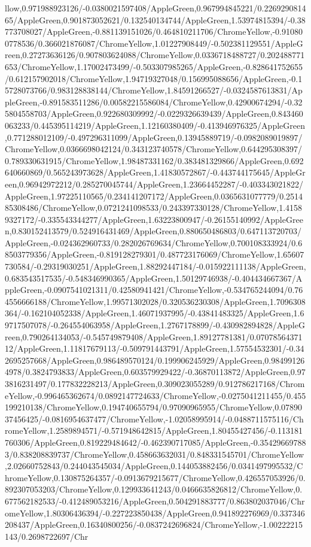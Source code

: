 {\begin{tikzternal}
llow,0.971988923126/-0.0380021597408/AppleGreen,0.967994845221/0.226929081465/AppleGreen,0.901873052621/0.132540134744/AppleGreen,1.53974815394/-0.38773708027/AppleGreen,-0.881139151026/0.464810211706/ChromeYellow,-0.910800778536/0.366021876087/ChromeYellow,1.01227908449/-0.502381129551/AppleGreen,0.27273636126/0.907803624088/ChromeYellow,0.0336718488727/0.202488771653/ChromeYellow,1.17002473499/-0.503307985265/AppleGreen,-0.828641752655/0.612157902018/ChromeYellow,1.94719327048/0.156995088656/AppleGreen,-0.15728073766/0.983128838144/ChromeYellow,1.84591266527/-0.0324587613831/AppleGreen,-0.891583511286/0.00582215586084/ChromeYellow,0.42900674294/-0.325804558703/AppleGreen,0.922680309992/-0.0229326639439/AppleGreen,0.843460063233/0.445395114219/AppleGreen,1.12160380409/-0.413946976325/AppleGreen,0.771288012109/-0.497296311099/AppleGreen,0.13945889719/-0.0982089019897/ChromeYellow,0.0366698042124/0.343123740578/ChromeYellow,0.644295308397/0.789330631915/ChromeYellow,1.98487331162/0.383481329866/AppleGreen,0.692640660869/0.565243973628/AppleGreen,1.41830572867/-0.443744175645/AppleGreen,0.96942972212/0.285270045744/AppleGreen,1.23664452287/-0.403343021822/AppleGreen,1.97225110565/0.234141207172/AppleGreen,0.0365631077779/0.251485308486/ChromeYellow,0.0721241098533/0.243397330128/ChromeYellow,1.41589327172/-0.335543344277/AppleGreen,1.63223800947/-0.26155140992/AppleGreen,0.830152413579/0.524916431469/AppleGreen,0.880650486803/0.647113720703/AppleGreen,-0.024362960733/0.282026769634/ChromeYellow,0.700108333924/0.68503779356/AppleGreen,-0.819128279301/0.487723176069/ChromeYellow,1.65607730584/-0.29319030251/AppleGreen,1.88292447184/-0.015922111138/AppleGreen,0.683543517535/-0.548346990365/AppleGreen,1.50129746938/-0.404434667367/AppleGreen,-0.0907541021311/0.42580941421/ChromeYellow,-0.534765244094/0.764556666188/ChromeYellow,1.99571302028/0.320536230308/AppleGreen,1.7096308364/-0.162104052338/AppleGreen,1.46071937995/-0.43841483325/AppleGreen,1.69717507078/-0.264554063958/AppleGreen,1.2767178899/-0.430982894828/AppleGreen,0.790264134053/-0.545749879408/AppleGreen,1.89127781381/0.0707856437112/AppleGreen,1.11817679113/-0.509791443791/AppleGreen,1.57554532301/-0.342695257668/AppleGreen,0.986489570124/0.199906245929/AppleGreen,0.984991264978/0.3824793833/AppleGreen,0.603579929422/-0.36870113872/AppleGreen,0.973816231497/0.177832228213/AppleGreen,0.309023055289/0.912786217168/ChromeYellow,-0.996465362674/0.0892147724633/ChromeYellow,-0.0275041211455/0.455199210138/ChromeYellow,0.194740655794/0.97090965955/ChromeYellow,0.0789037456425/-0.0816954637477/ChromeYellow,-1.02058995914/-0.0488711575116/ChromeYellow,1.2589894571/-0.571948642815/AppleGreen,1.80455427456/-0.113181760306/AppleGreen,0.819229484642/-0.462390717085/AppleGreen,-0.354296697883/0.838208839737/ChromeYellow,0.458663632031/0.848331545701/ChromeYellow,2.02660752843/0.244043545034/AppleGreen,0.144053882456/0.0341497995532/ChromeYellow,0.130875264357/-0.0913679215677/ChromeYellow,0.426557053926/0.892307053203/ChromeYellow,0.129933641243/0.0466635826812/ChromeYellow,0.677562182533/-0.412489053216/AppleGreen,0.504291883777/0.863802037046/ChromeYellow,1.80306436394/-0.227223850438/AppleGreen,0.941892276969/0.337346208437/AppleGreen,0.16340800256/-0.0837242696824/ChromeYellow,-1.00222215143/0.2698722697/Chr
\end{tikzternal}}
